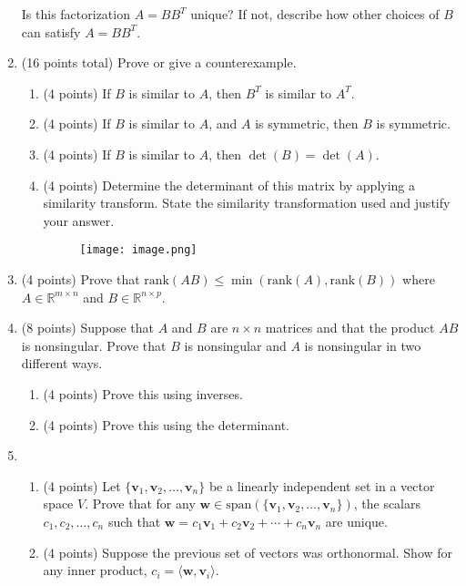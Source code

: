 \documentclass[12pt]{article}
\begin{document}
\begin{enumerate}
Is this factorization \( A = BB^T \) unique? If not, describe how other choices of \( B \) can satisfy \( A = BB^T \).
    
    \item (16 points total) Prove or give a counterexample.
    \begin{enumerate}
        \item (4 points) If \( B \) is similar to \( A \), then \( B^T \) is similar to \( A^T \).
        \item (4 points) If \( B \) is similar to \( A \), and \( A \) is symmetric, then \( B \) is symmetric.
        \item (4 points) If \( B \) is similar to \( A \), then \( \det(B) = \det(A) \).
         \item (4 points) Determine the determinant of this matrix by applying a similarity transform. State the similarity transformation used and justify your answer.
\begin{figure}[H]
    \centering
    \texttt{[image: image.png]}
    \captionsetup{labelformat=empty}
    \caption{}
\end{figure}
        \end{enumerate}
        
    
    \item (4 points) Prove that $\text{rank}(AB) \leq \min(\text{rank}(A), \text{rank}(B))$ where $A \in \mathbb{R}^{m \times n}$ and $B \in \mathbb{R}^{n \times p}$.

    
    \item (8 points) 
    Suppose that \( A \) and \( B \) are \( n \times n \) matrices and that the product \( AB \) is nonsingular. Prove that \( B \) is nonsingular and \( A \) is nonsingular in two different ways.
    \begin{enumerate}
        \item (4 points) Prove this using inverses.
        \item (4 points) Prove this using the determinant.
        
    \end{enumerate}

    \item \begin{enumerate}
        \item (4 points) Let $\{\mathbf{v}_1, \mathbf{v}_2, \dots, \mathbf{v}_n\}$ be a linearly independent set in a vector space $V$. Prove that for any $\mathbf{w} \in \text{span}(\{\mathbf{v}_1, \mathbf{v}_2, \dots, \mathbf{v}_n\})$, the scalars $c_1, c_2, \dots, c_n$ such that $\mathbf{w} = c_1 \mathbf{v}_1 + c_2 \mathbf{v}_2 + \cdots + c_n \mathbf{v}_n$ are unique.
        \item (4 points) Suppose the previous set of vectors was orthonormal. Show for any inner product, $
c_i = \langle \mathbf{w}, \mathbf{v}_i \rangle$.


\end{enumerate}
\end{enumerate}
\end{document}

